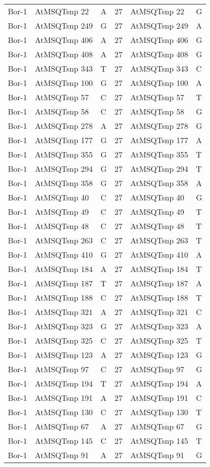 \begin{center}
\begin{longtable}{|l|l|l|l|l|l|}
Bor-1&AtMSQTsnp 22&A&27&AtMSQTsnp 22&G\\
Bor-1&AtMSQTsnp 249&G&27&AtMSQTsnp 249&A\\
Bor-1&AtMSQTsnp 406&A&27&AtMSQTsnp 406&G\\
Bor-1&AtMSQTsnp 408&A&27&AtMSQTsnp 408&G\\
Bor-1&AtMSQTsnp 343&T&27&AtMSQTsnp 343&C\\
Bor-1&AtMSQTsnp 100&G&27&AtMSQTsnp 100&A\\
Bor-1&AtMSQTsnp 57&C&27&AtMSQTsnp 57&T\\
Bor-1&AtMSQTsnp 58&C&27&AtMSQTsnp 58&G\\
Bor-1&AtMSQTsnp 278&A&27&AtMSQTsnp 278&G\\
Bor-1&AtMSQTsnp 177&G&27&AtMSQTsnp 177&A\\
Bor-1&AtMSQTsnp 355&G&27&AtMSQTsnp 355&T\\
Bor-1&AtMSQTsnp 294&G&27&AtMSQTsnp 294&T\\
Bor-1&AtMSQTsnp 358&G&27&AtMSQTsnp 358&A\\
Bor-1&AtMSQTsnp 40&C&27&AtMSQTsnp 40&G\\
Bor-1&AtMSQTsnp 49&C&27&AtMSQTsnp 49&T\\
Bor-1&AtMSQTsnp 48&C&27&AtMSQTsnp 48&T\\
Bor-1&AtMSQTsnp 263&C&27&AtMSQTsnp 263&T\\
Bor-1&AtMSQTsnp 410&G&27&AtMSQTsnp 410&A\\
Bor-1&AtMSQTsnp 184&A&27&AtMSQTsnp 184&T\\
Bor-1&AtMSQTsnp 187&T&27&AtMSQTsnp 187&A\\
Bor-1&AtMSQTsnp 188&C&27&AtMSQTsnp 188&T\\
Bor-1&AtMSQTsnp 321&A&27&AtMSQTsnp 321&C\\
Bor-1&AtMSQTsnp 323&G&27&AtMSQTsnp 323&A\\
Bor-1&AtMSQTsnp 325&C&27&AtMSQTsnp 325&T\\
Bor-1&AtMSQTsnp 123&A&27&AtMSQTsnp 123&G\\
Bor-1&AtMSQTsnp 97&C&27&AtMSQTsnp 97&G\\
Bor-1&AtMSQTsnp 194&T&27&AtMSQTsnp 194&A\\
Bor-1&AtMSQTsnp 191&A&27&AtMSQTsnp 191&C\\
Bor-1&AtMSQTsnp 130&C&27&AtMSQTsnp 130&T\\
Bor-1&AtMSQTsnp 67&A&27&AtMSQTsnp 67&G\\
Bor-1&AtMSQTsnp 145&C&27&AtMSQTsnp 145&T\\
Bor-1&AtMSQTsnp 91&A&27&AtMSQTsnp 91&G\\

\end{longtable}
\end{center}
